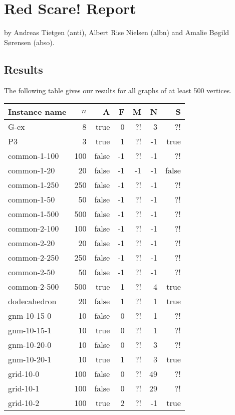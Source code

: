 \documentclass{tufte-handout}
\begin{document}
\section{Red Scare! Report}

by Andreas Tietgen (anti), Albert Rise Nielsen (albn) and Amalie Bøgild Sørensen (abso).

\subsection{Results}

The following table gives our results for all graphs of at least 500 vertices.

\medskip
\begin{longtable}{lrrrrrr}
\toprule
	Instance name & $n$ & A & F & M & N & S\\
	\midrule
	G-ex & 8 & true & 0 & ?! & 3 & ?!\\
	P3 & 3 & true & 1 & ?! & -1 & true\\
	common-1-100 & 100 & false & -1 & ?! & -1 & ?!\\
	common-1-20 & 20 & false & -1 & -1 & -1 & false\\
	common-1-250 & 250 & false & -1 & ?! & -1 & ?!\\
	common-1-50 & 50 & false & -1 & ?! & -1 & ?!\\
	common-1-500 & 500 & false & -1 & ?! & -1 & ?!\\
	common-2-100 & 100 & false & -1 & ?! & -1 & ?!\\
	common-2-20 & 20 & false & -1 & ?! & -1 & ?!\\
	common-2-250 & 250 & false & -1 & ?! & -1 & ?!\\
	common-2-50 & 50 & false & -1 & ?! & -1 & ?!\\
	common-2-500 & 500 & true & 1 & ?! & 4 & true\\
	dodecahedron & 20 & false & 1 & ?! & 1 & true\\
	gnm-10-15-0 & 10 & false & 0 & ?! & 1 & ?!\\
	gnm-10-15-1 & 10 & true & 0 & ?! & 1 & ?!\\
	gnm-10-20-0 & 10 & false & 0 & ?! & 3 & ?!\\
	gnm-10-20-1 & 10 & true & 1 & ?! & 3 & true\\
	grid-10-0 & 100 & false & 0 & ?! & 49 & ?!\\
	grid-10-1 & 100 & false & 0 & ?! & 29 & ?!\\
	grid-10-2 & 100 & true & 2 & ?! & -1 & true\\

\end{longtable}
\end{document}
